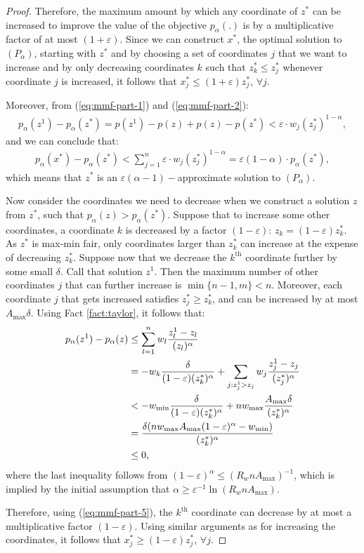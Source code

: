 \documentclass[11pt]{article}
\newcommand{\wratio}{R_w}
\begin{document}
\begin{proof}
Therefore, the maximum amount by which any coordinate of $z^*$ can be increased to improve the value of the objective $p_\alpha(.)$ is by a multiplicative factor of at most $(1+\varepsilon)$. Since we can construct $x^*$, the optimal solution to $(P_\alpha)$, starting with $z^*$ and by choosing a set of coordinates $j$ that we want to increase and by only decreasing coordinates $k$ such that $z_k^* \leq z_j^*$ whenever coordinate $j$ is increased, it follows that $x_j^* \leq (1+\varepsilon)z_j^*$, $\forall j$.

Moreover, from (\ref{eq:mmf-part-1}) and (\ref{eq:mmf-part-2}):
\begin{align*}
p_\alpha(z^1) - p_\alpha(z^*) = p(z^1) - p(z) + p(z) - p(z^*) < {\varepsilon}\cdot w_j(z_j^*)^{1-\alpha}, \end{align*}
and we can conclude that:
\begin{align*}
p_\alpha(x^*) - p_\alpha(z^*) < \sum_{j=1}^n {\varepsilon}\cdot w_j(z_j^*)^{1-\alpha} = {\varepsilon}(1-\alpha)\cdot p_\alpha(z^*),
\end{align*}
which means that $z^*$ is an ${\varepsilon}(\alpha-1)-$approximate solution to $(P_\alpha)$.

Now consider the coordinates we need to decrease when we construct a solution $z$ from $z^*$, such that $p_\alpha(z) > p_\alpha(z^*)$. Suppose that to increase some other coordinates, a coordinate $k$ is decreased by a factor $(1-\varepsilon)$: $z_k = (1-\varepsilon)z_k^*$. As $z^*$ is max-min fair, only coordinates larger than $z_k^*$ can increase at the expense of decreasing $z_k^*$. Suppose now that we decrease the $k^{\text{th}}$ coordinate further by some small $\delta$. Call that solution $z^1$. Then the maximum number of other coordinates $j$ that can further increase is $\min\{n-1, m\}< n$. Moreover, each coordinate $j$ that gets increased satisfies $z_j^*\geq z_k^*$, and can be increased by at most $A_{\max} \delta$. Using Fact \ref{fact:taylor}, it follows that: 
\begin{align}
p_\alpha(z^1) - p_\alpha(z) &\leq \sum_{l=1}^n w_l\frac{z_l^1 - z_l}{(z_l)^{\alpha}}\notag\\
&= -w_k \frac{\delta}{(1-\varepsilon)(z_k^*)^{\alpha}} + \sum_{j: z_j^1 > z_j} w_j \frac{z_j^1-z_j}{(z_j^*)^{\alpha}}\notag\\
&< -w_{\min} \frac{\delta}{(1-\varepsilon)(z_k^*)^{\alpha}} + n w_{\max} \frac{A_{\max}\delta}{(z_k^*)^{\alpha}}\notag\\
&= \frac{\delta(n w_{\max} A_{\max} (1-\varepsilon)^{\alpha} - w_{\min})}{(z_k^*)^{\alpha}}\notag\\
&\leq 0, \label{eq:mmf-part-5}
\end{align}
where the last inequality follows from $(1-\varepsilon)^{\alpha} \leq (\wratio n A_{\max})^{-1}$, which is implied by the initial assumption that $\alpha \geq {\varepsilon}^{-1}{\ln(\wratio n A_{\max})}$.

Therefore, using (\ref{eq:mmf-part-5}), the $k^{\text{th}}$ coordinate can decrease by at most a multiplicative factor $(1-\varepsilon)$. Using similar arguments as for increasing the coordinates, it follows that $x_j^* \geq (1-\varepsilon)z_j^*$, $\forall j$.
\end{proof}
\fi
\end{document}
